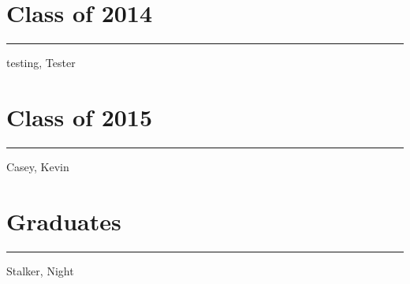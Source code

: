 \documentclass[11pt]{article}
\begin{document}

\section*{ Class of 2014 }
\vspace{-30pt}
\rule{\textwidth}{1pt}
\begin{multicols}{3}
	\begin{list}{}{\setlength{\itemsep}{-2mm} \setlength{\leftmargin}{0pt}}

		\item{testing, Tester}

	\end{list}
\end{multicols}

\section*{ Class of 2015 }
\vspace{-30pt}
\rule{\textwidth}{1pt}
\begin{multicols}{3}
	\begin{list}{}{\setlength{\itemsep}{-2mm} \setlength{\leftmargin}{0pt}}

		\item{Casey, Kevin}

	\end{list}
\end{multicols}

\section*{ Graduates }
\vspace{-30pt}
\rule{\textwidth}{1pt}
\begin{multicols}{3}
	\begin{list}{}{\setlength{\itemsep}{-2mm} \setlength{\leftmargin}{0pt}}

		\item{Stalker, Night}

	\end{list}
\end{multicols}
\end{document}
